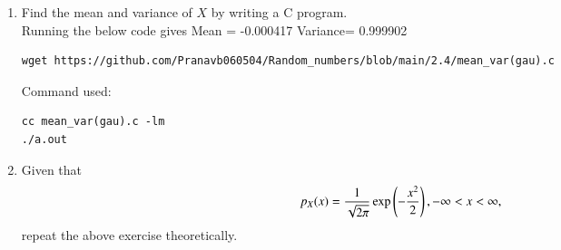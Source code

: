 \documentclass[journal,12pt,twocolumn]{IEEEtran}
\renewcommand\thesection{\arabic{section}}
\begin{document}
\begin{enumerate}[label=\thesection.\arabic*
,ref=\thesection.\theenumi]
\begin{itemize}
\item PDF is symmetric about $x=0$\\
\item graph is bell shaped\\
\item mean of graph is situated at the apex point of the bell\\
\end{itemize}
\item Find the mean and variance of $X$ by writing a C program.\\
\solution
Running the below code gives Mean = -0.000417 Variance= 0.999902
 \begin{lstlisting}
wget https://github.com/Pranavb060504/Random_numbers/blob/main/2.4/mean_var(gau).c
\end{lstlisting}
Command used:
\begin{lstlisting}
cc mean_var(gau).c -lm
./a.out
\end{lstlisting}
\item Given that 
\begin{align}
p_{X}(x) = \frac{1}{\sqrt{2\pi}}\exp\left(-\frac{x^2}{2}\right), -\infty < x < \infty,
\end{align}
repeat the above exercise theoretically.
%
\end{enumerate}
\end{document}
